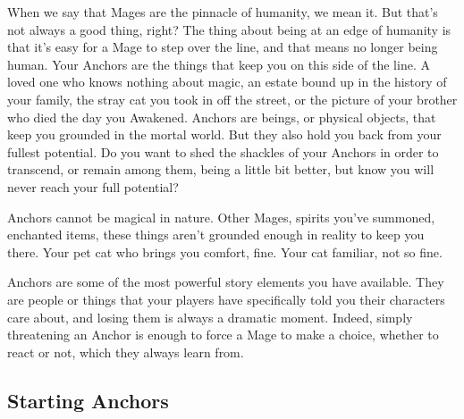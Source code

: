 \documentclass[
  oneside,
  statementpaper,
  9pt]{memoir}
\begin{document}
\begin{Player}

When we say that Mages are the pinnacle of humanity, we mean it. But that’s not always a good thing, right? The thing about being at an edge of humanity is that it’s easy for a Mage to step over the line, and that means no longer being human. Your Anchors are the things that keep you on this side of the line. A loved one who knows nothing about magic, an estate bound up in the history of your family, the stray cat you took in off the street, or the picture of your brother who died the day you Awakened. Anchors are beings, or physical objects, that keep you grounded in the mortal world. But they also hold you back from your fullest potential. Do you want to shed the shackles of your Anchors in order to transcend, or remain among them, being a little bit better, but know you will never reach your full potential?

Anchors cannot be magical in nature. Other Mages, spirits you’ve summoned, enchanted items, these things aren’t grounded enough in reality to keep you there. Your pet cat who brings you comfort, fine. Your cat familiar, not so fine.

\end{Player}

\begin{MC}

Anchors are some of the most powerful story elements you have available. They are people or things that your players have specifically told you their characters care about, and losing them is always a dramatic moment. Indeed, simply threatening an Anchor is enough to force a Mage to make a choice, whether to react or not, which they always learn from.

\end{MC}

\hypertarget{starting-anchors}{%
\subsection{Starting Anchors}\label{starting-anchors}}
\end{document}
